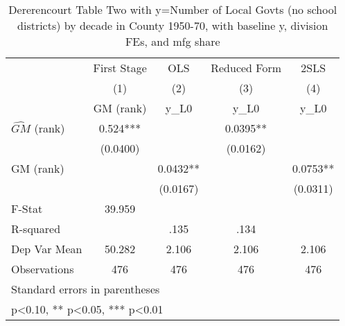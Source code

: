 \begin{table}[htbp]\centering
\def\sym#1{\ifmmode^{#1}\else\(^{#1}\)\fi}
\caption{Dererencourt Table Two with y=Number of Local Govts (no school districts) by decade in County 1950-70, with baseline y, division FEs, and mfg share}
\begin{tabular}{l*{4}{c}}
\toprule
                    & First Stage   &         OLS   &Reduced Form   &        2SLS   \\
                    &\multicolumn{1}{c}{(1)}&\multicolumn{1}{c}{(2)}&\multicolumn{1}{c}{(3)}&\multicolumn{1}{c}{(4)}\\
                    &\multicolumn{1}{c}{GM  (rank)}&\multicolumn{1}{c}{y\_L0}&\multicolumn{1}{c}{y\_L0}&\multicolumn{1}{c}{y\_L0}\\
\midrule
$\hat{GM}$ (rank)   &       0.524***&               &      0.0395** &               \\
                    &    (0.0400)   &               &    (0.0162)   &               \\
\addlinespace
GM  (rank)          &               &      0.0432** &               &      0.0753** \\
                    &               &    (0.0167)   &               &    (0.0311)   \\
\midrule
F-Stat              &      39.959   &               &               &               \\
R-squared           &               &        .135   &        .134   &               \\
Dep Var Mean        &      50.282   &       2.106   &       2.106   &       2.106   \\
Observations        &         476   &         476   &         476   &         476   \\
\bottomrule
\multicolumn{5}{l}{\footnotesize Standard errors in parentheses}\\
\multicolumn{5}{l}{\footnotesize * p<0.10, ** p<0.05, *** p<0.01}\\
\end{tabular}
\end{table}

